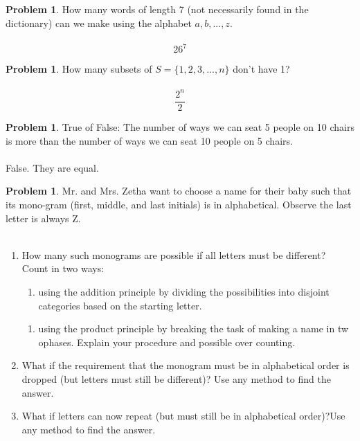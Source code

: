 \documentclass[10pt,leqno ]{article}
\theoremstyle{definition}
\newtheorem{problem}[theorem]{Problem}
\begin{document}
\begin{problem} How many words of length 7 (not necessarily found in the dictionary) can we make using the alphabet ${a, b, . . . , z}$.
\\\\
\Large
$$26^7$$
\end{problem}
\newpage

\begin{problem} How many subsets of $S=\{1,2,3, . . . , n\}$ don’t have 1?
\\\\
\Large
$$\frac{2^n}{2}$$
\end{problem}
\newpage

\begin{problem} True of False:  The number of ways we can seat 5 people on 10 chairs is more than the number of ways we can seat 10 people on 5 chairs.
\\\\
\Large
False.  They are equal.
\end{problem}
\newpage

\begin{problem} Mr.  and Mrs.  Zetha want to choose a name for their baby such that its mono-gram (first, middle, and last initials) is in alphabetical.  Observe the last letter is always Z.
\\
\\
\begin{enumerate}
\item How  many  such  monograms  are  possible  if  all  letters  must  be  different?  Count in two ways:
\begin{enumerate}
\item using the addition principle by dividing the possibilities into disjoint categories based on the starting letter.
\end{enumerate}
\begin{enumerate}
\item using the product principle by breaking the task of making a name in tw ophases.  Explain your procedure and possible over counting.
\end{enumerate}


\newpage
\item What if the requirement that the monogram must be in alphabetical order is dropped (but letters must still be different)? Use any method to find the answer.


\newpage
\item What  if  letters  can  now  repeat  (but  must  still  be  in  alphabetical  order)?Use any method to find the answer.
\end{enumerate}
\end{problem}
\end{document}
